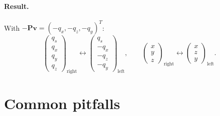 \documentclass{article}
\theoremstyle{plain}
\theoremstyle{definition}
\newcommand{\vect}[1]{\boldsymbol{#1}}
\begin{document}
\paragraph{Result.} With $-\vect P\vect v = (-q_x, -q_z, -q_y)^T$:
\begin{equation}\label{eq:rule2}
  \begin{pmatrix} q_s \\ q_x \\ q_y \\ q_z \end{pmatrix}_{\!\text{right}}
  \longleftrightarrow
  \begin{pmatrix} q_s \\ -q_x \\ -q_z \\ -q_y \end{pmatrix}_{\!\text{left}},
  \qquad
  \begin{pmatrix} x \\ y \\ z \end{pmatrix}_{\!\text{right}}
  \longleftrightarrow
  \begin{pmatrix} x \\ z \\ y \end{pmatrix}_{\!\text{left}}.
\end{equation}

\section{Common pitfalls}\label{sec:pitfalls}
\end{document}

